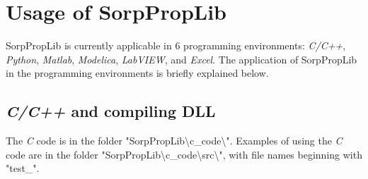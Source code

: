 \chapter{Usage of SorpPropLib}
\label{cha:usage}
%
SorpPropLib is currently applicable in 6 programming environments: \textit{C/C++}, \textit{Python}, \textit{Matlab}, \textit{Modelica}, \textit{LabVIEW}, and \textit{Excel}. The application of SorpPropLib in the programming environments is briefly explained below.
\section{\textit{C/C++} and compiling DLL}
\label{cha:usage:c}
%
The \textit{C} code is in the folder "SorpPropLib\textbackslash c\_code\textbackslash". Examples of using the \textit{C} code are in the folder "SorpPropLib\textbackslash c\_code\textbackslash src\textbackslash", with file names beginning with "test\_".

